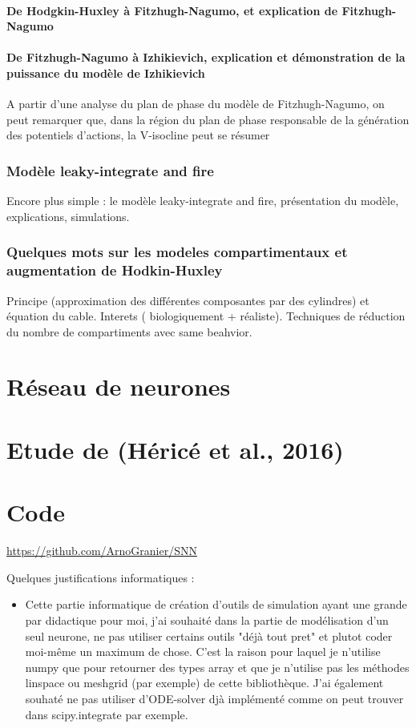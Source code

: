 \documentclass[12pt]{scrartcl}
\begin{document}
\subsection{De Hodgkin-Huxley à Fitzhugh-Nagumo, et explication de Fitzhugh-Nagumo}

\subsection{De Fitzhugh-Nagumo à Izhikievich, explication et démonstration de la puissance du modèle de Izhikievich}
	A partir d'une analyse du plan de phase du modèle de Fitzhugh-Nagumo, on peut remarquer que, dans la région du plan de phase responsable de la génération des potentiels d'actions, la V-isocline peut se résumer

\section{Modèle leaky-integrate and fire}
	Encore plus simple : le modèle leaky-integrate and fire, présentation du modèle, explications, simulations.


\section{Quelques mots sur les modeles compartimentaux et augmentation de Hodkin-Huxley}\label{hhcomplex}
	Principe (approximation des différentes composantes par des cylindres) et équation du cable. Interets ( biologiquement + réaliste). Techniques de réduction du nombre de compartiments avec same beahvior. 

\nocite{*}

\pagebreak

\part{Réseau de neurones}

\part{Etude de (Héricé et al., 2016) }

\part{Code}
\url{https://github.com/ArnoGranier/SNN}

Quelques justifications informatiques :
\begin{itemize} \item Cette partie informatique de création d'outils de simulation ayant une grande par didactique pour moi, j'ai souhaité dans la partie de modélisation d'un seul neurone, ne pas utiliser certains outils "déjà tout pret" et plutot coder moi-même un maximum de chose. C'est la raison pour laquel je n'utilise numpy que pour retourner des types array et que je n'utilise pas les méthodes linspace ou meshgrid (par exemple) de cette bibliothèque. J'ai également souhaté ne pas utiliser d'ODE-solver djà implémenté comme on peut trouver dans scipy.integrate par exemple. \end{itemize}




\end{document}
